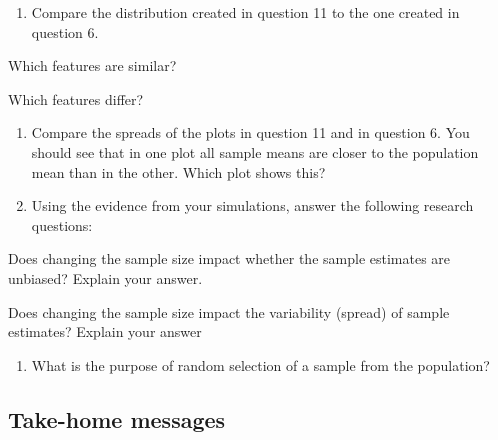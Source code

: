 \documentclass[
]{report}
\providecommand{\tightlist}{%
  \setlength{\itemsep}{0pt}\setlength{\parskip}{0pt}}
\newcommand{\rgi}{\hspace{24pt}}  %
\begin{document}
\begin{enumerate}
\def\labelenumi{\arabic{enumi}.}
\setcounter{enumi}{11}
\tightlist
\item
  Compare the distribution created in question 11 to the one created in question 6.
\end{enumerate}

\rgi Which features are similar?\\
\vspace{0.3in}

\rgi Which features differ?

\vspace{0.3in}

\newpage

\begin{enumerate}
\def\labelenumi{\arabic{enumi}.}
\setcounter{enumi}{12}
\item
  Compare the spreads of the plots in question 11 and in question 6. You should see that in one plot all sample means are closer to the population mean than in the other. Which plot shows this?
  \vspace{0.4in}
\item
  Using the evidence from your simulations, answer the following research questions:
\end{enumerate}

\rgi Does changing the sample size impact whether the sample estimates are unbiased? Explain your answer.
\vspace{0.5in}

\rgi Does changing the sample size impact the variability (spread) of sample estimates? Explain your answer
\vspace{0.5in}

\begin{enumerate}
\def\labelenumi{\arabic{enumi}.}
\setcounter{enumi}{14}
\tightlist
\item
  What is the purpose of random selection of a sample from the population?
\end{enumerate}

\vspace{0.8in}

\hypertarget{take-home-messages-2}{%
\subsection{Take-home messages}\label{take-home-messages-2}}
\end{document}
